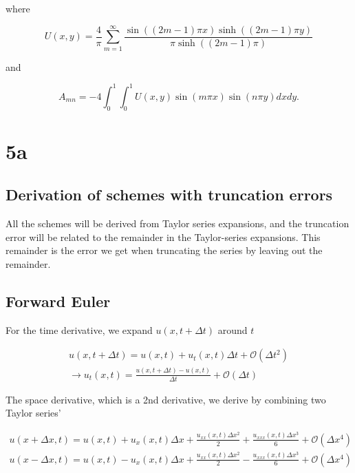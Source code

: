 \documentclass{article}
\begin{document}
where

\begin{equation}
U(x,y) = \frac{4}{\pi} \sum_{m=1}^{\infty} \frac{\sin((2m-1)\pi x)\sinh((2m-1)\pi y)}{\pi \sinh((2m-1)\pi)}
\end{equation}

and 

\begin{equation}
A_{mn} = -4 \int_0^1 \int_0^1 U(x,y) \sin(m\pi x)\sin(n\pi y) dxdy.
\end{equation}



\section{5a}

\subsection{Derivation of schemes with truncation errors}
All the schemes will be derived from Taylor series expansions, and the truncation error will be related to the remainder in the Taylor-series expansions. This remainder is the error we get when truncating the series by leaving out the remainder.\\

\subsection{Forward Euler}
For the time derivative, we expand $u(x, t + \Delta t)$ around $t$

\begin{subequations}
	\begin{align}
		u(x, t+ \Delta t)  = u(x,t) +  u_t(x,t) \Delta t + \mathcal{O}(\Delta t^2)\\
		\rightarrow u_t(x,t) = \frac{u(x, t+ \Delta t) - u(x,t)}{\Delta t} + \mathcal{O}(\Delta t)\label{eq:FeTime}
	\end{align}
\end{subequations}

The space derivative, which is a 2nd derivative, we derive by combining two Taylor series'

\begin{subequations}
	\begin{align}
		u(x + \Delta x,t) = u(x,t) + u_x(x,t)\Delta x + \frac{u_{xx}(x,t) \Delta x^2}{2} + \frac{u_{xxx}(x,t) \Delta x^3}{6} + \mathcal{O}(\Delta x^4)\label{eq:feSpace1}\\
		u(x - \Delta x,t) = u(x,t) - u_x(x,t)\Delta x + \frac{u_{xx}(x,t) \Delta x^2}{2} - \frac{u_{xxx}(x,t) \Delta x^3}{6} + \mathcal{O}(\Delta x^4)\label{eq:feSpace2}
	\end{align}
\end{subequations}
\end{document}
